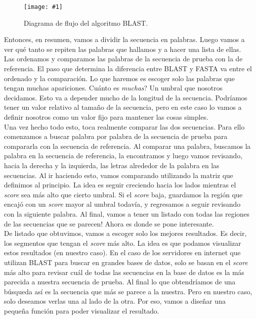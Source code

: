 \documentclass[10pt,letterpaper]{article}
\newcommand{\Picture}[3]
{
	\begin{figure}[H]
	\begin{center}
	\caption{#3}
	\texttt{[image: \#1]}
	\end{center}
	\end{figure}
}
\begin{document}
\Picture{img/BLAST.png}{0.6}{Diagrama de flujo del algoritmo BLAST.}

Entonces, en resumen, vamos a dividir la secuencia en palabras. Luego vamos a ver qu\'e tanto se repiten las palabras que hallamos y a hacer una lista de ellas. Las ordenamos y comparamos las palabras de la secuencia de prueba con la de referencia. El paso que determina la diferencia entre BLAST y FASTA va entre el ordenado y la comparaci\'on. Lo que haremos es escoger solo las palabras que tengan muchas apariciones. Cu\'anto es \emph{muchas}? Un umbral que nosotros decidamos. Esto va a depender mucho de la longitud de la secuencia. Podr\'iamos tener un valor relativo al tama\~no de la secuencia, pero en este caso lo vamos a definir nosotros como un valor fijo para mantener las cosas simples.\\

Una vez hecho todo esto, toca realmente comparar las dos secuencias. Para ello comenzamos a buscar palabra por palabra de la secuencia de prueba para compararla con la secuencia de referencia. Al comparar una palabra, buscamos la palabra en la secuencia de referencia, la encontramos y luego vamos revisando, hacia la derecha y la izquierda, las letras alrededor de la palabra en las secuencias. Al ir haciendo esto, vamos comparando utilizando la matriz que definimos al principio. La idea es seguir creciendo hacia los lados mientras el \emph{score} sea m\'as alto que cierto umbral. Si el \emph{score} baja, guardamos la regi\'on que encaj\'o con un \emph{score} mayor al umbral todav\'ia, y regresamos a seguir revisando con la siguiente palabra. Al final, vamos a tener un listado con todas las regiones de las secuencias que se parecen! Ahora es donde se pone interesante.\\

De listado que obtuvimos, vamos a escoger solo los mejores resultados. Es decir, los segmentos que tengan el \emph{score} m\'as alto. La idea es que podamos visualizar estos resultados (en nuestro caso). En el caso de los servidores en internet que utilizan BLAST para buscar en grandes bases de datos, solo se basan en el \emph{score} m\'as alto para revisar cu\'al de todas las secuencias en la base de datos es la m\'as parecida a nuestra secuencia de prueba. Al final lo que obtendr\'iamos de una b\'usqueda as\'i es la secuencia que m\'as se parece a la nuestra. Pero en nuestro caso, solo deseamos verlas una al lado de la otra. Por eso, vamos a dise\~nar una peque\~na funci\'on para poder visualizar el resultado.\\
\end{document}
